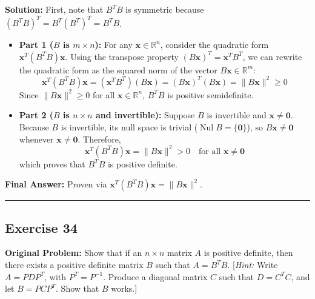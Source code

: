 \documentclass[11pt, letterpaper]{article}
\theoremstyle{definition}
\theoremstyle{remark}
\begin{document}
\textbf{Solution:}
First, note that $B^T B$ is symmetric because $(B^T B)^T = B^T (B^T)^T = B^T B$.
\begin{itemize}
    \item \textbf{Part 1 ($B$ is $m \times n$):} For any $\mathbf{x} \in \mathbb{R}^n$, consider the quadratic form $\mathbf{x}^T (B^T B) \mathbf{x}$. Using the transpose property $(B\mathbf{x})^T = \mathbf{x}^T B^T$, we can rewrite the quadratic form as the squared norm of the vector $B\mathbf{x} \in \mathbb{R}^m$:
    \[
    \mathbf{x}^T (B^T B) \mathbf{x} = (\mathbf{x}^T B^T)(B\mathbf{x}) = (B\mathbf{x})^T (B\mathbf{x}) = \|B\mathbf{x}\|^2 \ge 0
    \]
    Since $\|B\mathbf{x}\|^2 \ge 0$ for all $\mathbf{x} \in \mathbb{R}^n$, $B^T B$ is positive semidefinite.
    \item \textbf{Part 2 ($B$ is $n \times n$ and invertible):} Suppose $B$ is invertible and $\mathbf{x} \neq \mathbf{0}$. Because $B$ is invertible, its null space is trivial ($\operatorname{Nul} B = \{\mathbf{0}\}$), so $B\mathbf{x} \neq \mathbf{0}$ whenever $\mathbf{x} \neq \mathbf{0}$. Therefore,
    \[
    \mathbf{x}^T (B^T B) \mathbf{x} = \|B\mathbf{x}\|^2 > 0 \quad \text{for all } \mathbf{x} \neq \mathbf{0}
    \]
    which proves that $B^T B$ is positive definite.
\end{itemize}
\textbf{Final Answer:} Proven via $\mathbf{x}^T(B^T B)\mathbf{x} = \|B\mathbf{x}\|^2$.

\medskip\hrule\medskip

\subsection*{Exercise 34}
\textbf{Original Problem:} Show that if an $n \times n$ matrix $A$ is positive definite, then there exists a positive definite matrix $B$ such that $A = B^T B$. [\textit{Hint:} Write $A = P D P^T$, with $P^T = P^{-1}$. Produce a diagonal matrix $C$ such that $D = C^T C$, and let $B = P C P^T$. Show that $B$ works.]
\end{document}
